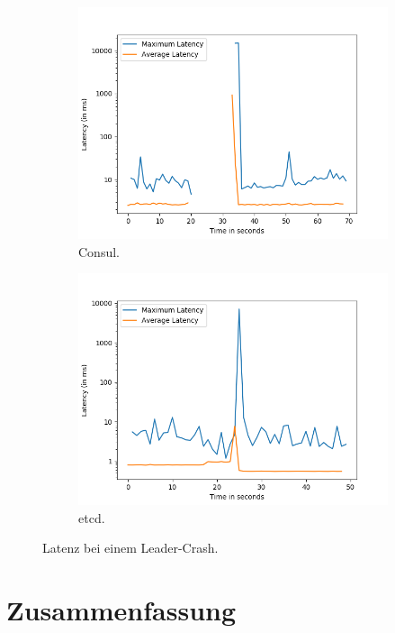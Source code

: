\begin{figure}[t]
\begin{subfigure}[t]{0.45\textwidth}
		\includegraphics[width=\textwidth]{img/leader_crash_consul.png}
		\caption{Consul.}
	\end{subfigure}
	\begin{subfigure}[t]{0.45\textwidth}
		\includegraphics[width=\textwidth]{img/leader_crash_etcd.png}
		\caption{etcd.}
	\end{subfigure}
	\caption{Latenz bei einem Leader-Crash.}
	\label{fig:leader-crash}
\end{figure}

\section{Zusammenfassung}

